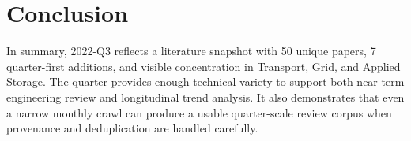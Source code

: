 \documentclass[conference]{IEEEtran}
\begin{document}
\section{Conclusion}
In summary, 2022-Q3 reflects a literature snapshot with 50 unique papers, 7 quarter-first additions, and visible concentration in Transport, Grid, and Applied Storage. The quarter provides enough technical variety to support both near-term engineering review and longitudinal trend analysis. It also demonstrates that even a narrow monthly crawl can produce a usable quarter-scale review corpus when provenance and deduplication are handled carefully.



\end{document}

